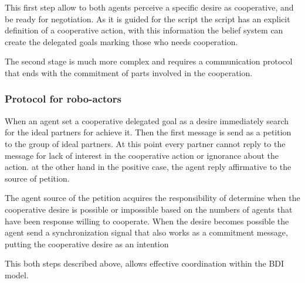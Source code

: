 This first step allow to both agents perceive a specific desire as cooperative, and be ready for negotiation. As it is guided for the script the script has an explicit definition of a cooperative action, with this information the belief system can create the delegated goals marking those who needs cooperation.


The second stage is much more complex and requires a communication protocol that ends with the commitment of parts involved in the cooperation. 

\subsubsection{Protocol for robo-actors}

When an agent set a cooperative delegated goal as a desire immediately search for the ideal partners for achieve it. Then the first message is send  as a petition to the group of ideal partners. At this point every partner cannot reply to the message for lack of interest in the cooperative action or ignorance about the action. at the other hand in the positive case, the agent reply affirmative to the source of petition.

The agent source of the petition acquires the responsibility of determine when the cooperative desire is possible or impossible based on the numbers of agents that have been response willing to cooperate. When the desire becomes possible the agent send a synchronization signal that also works as a commitment message, putting the cooperative desire as an intention

This both steps described above, allows effective coordination within the BDI model. 

